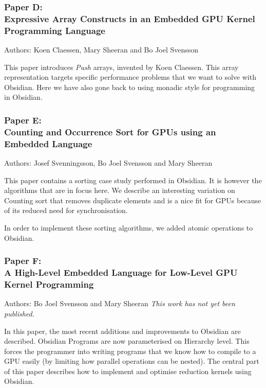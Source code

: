 \documentclass[a4paper]{book}
\newcommand{\paperD}{Paper D}
\newcommand{\paperDTitle}{Expressive Array Constructs in an Embedded GPU Kernel Programming Language}
\newcommand{\paperE}{Paper E}
\newcommand{\paperETitle}{Counting and Occurrence Sort for GPUs using an Embedded Language}
\newcommand{\paperF}{Paper F}
\newcommand{\paperFTitle}{A High-Level Embedded Language for Low-Level GPU Kernel Programming}
\begin{document}
\subsubsection{\paperD: \\ \paperDTitle}

Authors: Koen Claessen, Mary Sheeran and  Bo Joel Svensson \newline

\vspace{5mm}

This paper introduces {\em Push} arrays, invented by Koen Claessen. This 
array representation targets specific performance problems that we want 
to solve with Obsidian. Here we have also gone back to using monadic 
style for programming in Obsidian. 


\subsubsection{\paperE: \\ \paperETitle} 

Authors: Josef Svenningsson, Bo Joel Svensson and Mary Sheeran \newline

\vspace{5mm}

This paper contains a sorting case study performed in Obsidian. It 
is however the algorithms that are in focus here. We describe 
an interesting variation on Counting sort that removes duplicate 
elements and is a nice fit for GPUs because of its reduced need for 
synchronisation. 

In order to implement these sorting algorithms, we added atomic operations 
to Obsidian. 

\subsubsection{\paperF: \\ \paperFTitle}

Authors: Bo Joel Svensson and Mary Sheeran \newline
\noindent \emph{This work has not yet been published.}
\vspace{5mm} 

\noindent 

In this paper, the most recent additions and improvements to Obsidian are 
described. Obsidian Programs are now parameterised on Hierarchy level. This forces
the programmer into writing programs that we know how to compile to a GPU easily 
(by limiting how parallel operations can be nested). The central part of this paper 
describes how to implement and optimise reduction kernels using Obsidian. 
\end{document}
